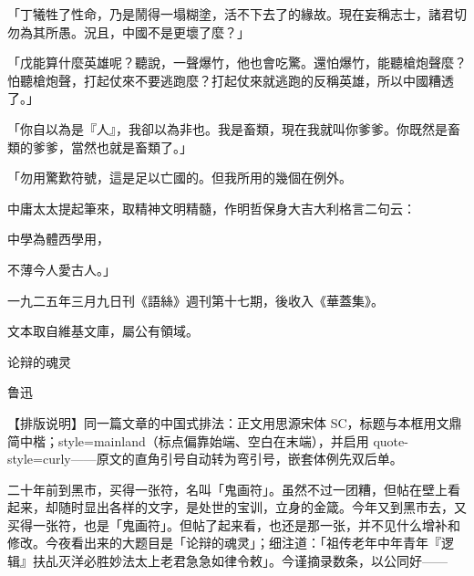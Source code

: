 \documentclass[12pt]{article}
\newcommand\en[1]{{\garamond #1}}
\begin{document}
「丁犧牲了性命，乃是鬧得一塌糊塗，活不下去了的緣故。現在妄稱志士，諸君切勿為其所愚。況且，中國不是更壞了麼？」

「戊能算什麼英雄呢？聽說，一聲爆竹，他也會吃驚。還怕爆竹，能聽槍炮聲麼？怕聽槍炮聲，打起仗來不要逃跑麼？打起仗來就逃跑的反稱英雄，所以中國糟透了。」

「你自以為是『人』，我卻以為非也。我是畜類，現在我就叫你爹爹。你既然是畜類的爹爹，當然也就是畜類了。」

「勿用驚歎符號，這是足以亡國的。但我所用的幾個在例外。

中庸太太提起筆來，取精神文明精髓，作明哲保身大吉大利格言二句云：

中學為體西學用，

不薄今人愛古人。」

\vspace{0.6em}
{\small 一九二五年三月九日刊《語絲》週刊第十七期，後收入《華蓋集》。

文本取自維基文庫，屬公有領域。}


\clearpage
\scserif
{}

{\centering\kaitisc{} 论辩的魂灵\par}
\vspace{0.3em}
{\centering\kaitisc{} 鲁迅\par}
\vspace{1.2em}

\noindent\setlength{\fboxsep}{0.8em}%
\colorbox{blue!7!cyan!5}{\parbox{\dimexpr\linewidth-2\fboxsep\relax}{%
  \kaitisc\small\setlength{\parindent}{0pt}\color{black!75}%
  【排版说明】同一篇文章的中国式排法：正文用思源宋体 \en{SC}，标题与本框用文鼎简中楷；\en{style=mainland}（标点偏靠始端、空白在末端），并启用 \en{quote-style=curly}——原文的直角引号自动转为弯引号，嵌套体例先双后单。}}
\vspace{0.8em}

二十年前到黑市，买得一张符，名叫「鬼画符」。虽然不过一团糟，但帖在壁上看起来，却随时显出各样的文字，是处世的宝训，立身的金箴。今年又到黑市去，又买得一张符，也是「鬼画符」。但帖了起来看，也还是那一张，并不见什么增补和修改。今夜看出来的大题目是「论辩的魂灵」；细注道：「祖传老年中年青年『逻辑』扶乩灭洋必胜妙法太上老君急急如律令敕」。今谨摘录数条，以公同好——
\end{document}
